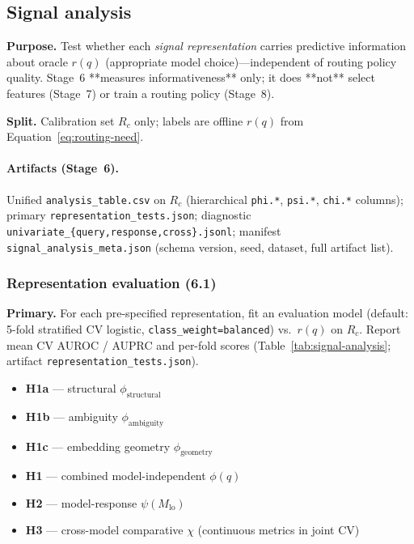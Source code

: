 \subsection{Signal analysis}
\label{sec:signal-analysis}

\textbf{Purpose.} Test whether each \emph{signal representation} carries predictive information about oracle $r(q)$ (appropriate model choice)---independent of routing policy quality.
Stage~6 **measures informativeness** only; it does **not** select features (Stage~7) or train a routing policy (Stage~8).

\textbf{Split.} Calibration set $R_c$ only; labels are offline $r(q)$ from Equation~\eqref{eq:routing-need}.

\paragraph{Artifacts (Stage~6).}
Unified \texttt{analysis\_table.csv} on $R_c$ (hierarchical \texttt{phi.*}, \texttt{psi.*}, \texttt{chi.*} columns); primary \texttt{representation\_tests.json}; diagnostic \texttt{univariate\_\{query,response,cross\}.jsonl}; manifest \texttt{signal\_analysis\_meta.json} (schema version, seed, dataset, full artifact list).

\subsubsection{Representation evaluation (6.1)}
\label{sec:signal-analysis-representation}

\textbf{Primary.} For each pre-specified representation, fit an evaluation model (default: 5-fold stratified CV logistic, \texttt{class\_weight=balanced}) vs.\ $r(q)$ on $R_c$.
Report mean CV AUROC / AUPRC and per-fold scores (Table~\ref{tab:signal-analysis}; artifact \texttt{representation\_tests.json}).

\begin{itemize}
  \item \textbf{H1a} --- structural $\phi_{\text{structural}}$
  \item \textbf{H1b} --- ambiguity $\phi_{\text{ambiguity}}$
  \item \textbf{H1c} --- embedding geometry $\phi_{\text{geometry}}$
  \item \textbf{H1} --- combined model-independent $\phi(q)$
  \item \textbf{H2} --- model-response $\psi(M_{\mathrm{lo}})$
  \item \textbf{H3} --- cross-model comparative $\chi$ (continuous metrics in joint CV)
\end{itemize}

